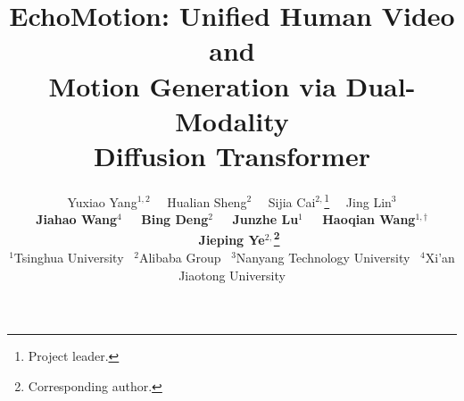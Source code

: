 \documentclass{article} %
\title{EchoMotion: Unified Human Video and \\
Motion Generation via Dual-Modality \\
Diffusion Transformer}
\author{Yuxiao Yang$^{1,2}$ ~~Hualian Sheng$^2$ ~~Sijia Cai$^{2,}$\thanks{Project leader.} ~~Jing Lin$^3$ \\ 
\textbf{Jiahao Wang$^4$ ~~Bing Deng$^2$ ~~Junzhe Lu$^1$ ~~Haoqian Wang$^{1,\dagger}$ ~~Jieping Ye$^{2,}$\thanks{Corresponding author.}} 
\\
\small $^1$Tsinghua University ~$^2$Alibaba Group ~$^3$Nanyang Technology University  ~$^4$Xi'an Jiaotong University
\\
}
\begin{document}
\maketitle














\vfill
\end{document}
